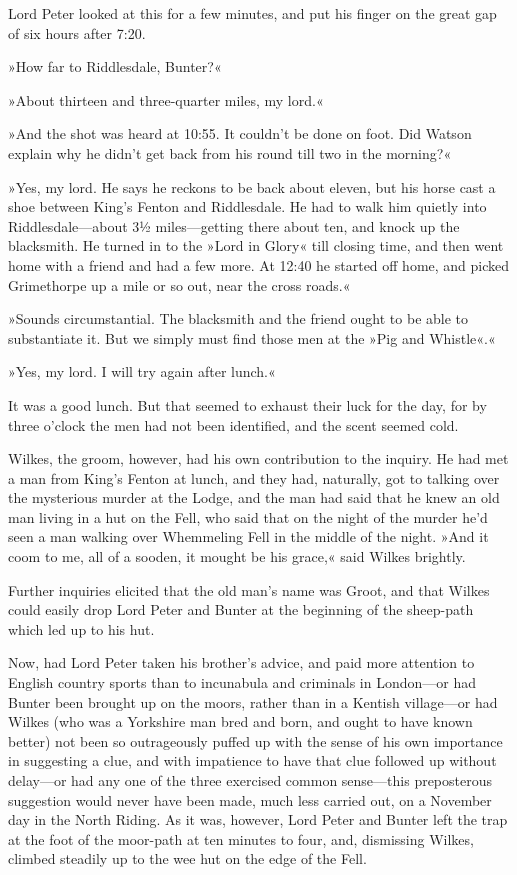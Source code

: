 Lord Peter looked at this for a few minutes, and put his finger on the great gap of six hours after 7:20.

»How far to Riddlesdale, Bunter?«

»About thirteen and three-quarter miles, my lord.«

»And the shot was heard at 10:55. It couldn't be done on foot. Did Watson explain why he didn't get back from his round till two in the morning?«

»Yes, my lord. He says he reckons to be back about eleven, but his horse cast a shoe between King's Fenton and Riddlesdale. He had to walk him quietly into Riddlesdale—about 3½ miles—getting there about ten, and knock up the blacksmith. He turned in to the »Lord in Glory« till closing time, and then went home with a friend and had a few more. At 12:40 he started off home, and picked Grimethorpe up a mile or so out, near the cross roads.«

»Sounds circumstantial. The blacksmith and the friend ought to be able to substantiate it. But we simply must find those men at the »Pig and Whistle«.«

»Yes, my lord. I will try again after lunch.«

It was a good lunch. But that seemed to exhaust their luck for the day, for by three o'clock the men had not been identified, and the scent seemed cold.

Wilkes, the groom, however, had his own contribution to the inquiry. He had met a man from King's Fenton at lunch, and they had, naturally, got to talking over the mysterious murder at the Lodge, and the man had said that he knew an old man living in a hut on the Fell, who said that on the night of the murder he'd seen a man walking over Whemmeling Fell in the middle of the night. »And it coom to me, all of a sooden, it mought be his grace,« said Wilkes brightly.

Further inquiries elicited that the old man's name was Groot, and that Wilkes could easily drop Lord Peter and Bunter at the beginning of the sheep-path which led up to his hut.

Now, had Lord Peter taken his brother's advice, and paid more attention to English country sports than to incunabula and criminals in London—or had Bunter been brought up on the moors, rather than in a Kentish village—or had Wilkes (who was a Yorkshire man bred and born, and ought to have known better) not been so outrageously puffed up with the sense of his own importance in suggesting a clue, and with impatience to have that clue followed up without delay—or had any one of the three exercised common sense—this preposterous suggestion would never have been made, much less carried out, on a November day in the North Riding. As it was, however, Lord Peter and Bunter left the trap at the foot of the moor-path at ten minutes to four, and, dismissing Wilkes, climbed steadily up to the wee hut on the edge of the Fell.

